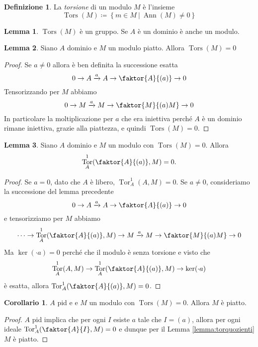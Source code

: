 \documentclass[a4paper,11pt,oneside]{book}
\newcommand{\set}[1]{\left\{ #1 \right\}}
\DeclareMathOperator{\Tor}{Tor}
\DeclareMathOperator{\tors}{Tors}
\DeclareMathOperator{\Ann}{Ann}
\theoremstyle{definition}
\newtheorem{de}{Definizione}
\newtheorem{lemma}{Lemma}
\newtheorem{cor}{Corollario}
\begin{document}
  \begin{de}
   La \emph{torsione} di un modulo $M$ è l'insieme 
   \[
    \tors(M)\coloneqq \set{m\in M \ |\ \Ann (M) \neq 0}
   \]
  \end{de}
  \begin{lemma}
   $\tors(M)$ è un gruppo. Se $A$ è un dominio è anche un modulo.
  \end{lemma}
  \begin{lemma}
   Siano $A$ dominio e $M$ un modulo piatto. Allora $\tors(M)=0$
  \end{lemma}
  \begin{proof}
   Se $a\neq 0$ allora è ben definita la successione esatta
   		\[
		 0\rightarrow A \xrightarrow a  A  \rightarrow  \faktor {A} {(a)} \rightarrow 0
		\]
  Tensorizzando per $M$ abbiamo
		\[
		 0\rightarrow M \xrightarrow a  M  \rightarrow  \faktor {M} {(a)M} \rightarrow 0
		\]
  In particolare la moltiplicazione per $a$ che era iniettiva perché $A$ è un dominio rimane iniettiva, grazie alla piattezza,
  e quindi $\tors(M)=0$. 
  \end{proof}
  \begin{lemma}
    Siano $A$ dominio e $M$ un modulo con $\tors(M)=0$. Allora
    \[
     \Tor_A^1(\faktor {A} {(a)}, M)=0.
    \]
  \end{lemma}
  \begin{proof}
   Se $a=0$, dato che $A$ è libero, $\Tor_A^1( {A}, M)=0$. Se $a\neq0$, consideriamo la successione del lemma precedente 
		\[
		 0\rightarrow A \xrightarrow a  A  \rightarrow  \faktor {A} {(a)} \rightarrow 0
		\]
  e tensorizziamo per $M$ abbiamo
		\[
		 \cdots\rightarrow\Tor_A^1(\faktor {A} {(a)}, M)\rightarrow M \xrightarrow a  M
		 \rightarrow  \faktor {M} {(a)M} \rightarrow 0
		\]
    Ma $\ker (\cdot a)=0$ perché che il modulo è senza torsione e visto che 
		\[
		 \Tor_A^1( {A}, M)\rightarrow \Tor_A^1(\faktor {A} {(a)}, M)  \rightarrow  \ker (\cdot a)
		\]
    è esatta, allora $\Tor_A^1(\faktor {A} {(a)}, M)=0$.
  \end{proof}
  
  \begin{cor}
   $A$ {\sc pid} e e $M$ un modulo con $\tors(M)=0$. Allora $M$ è piatto.
  \end{cor}
  \begin{proof}
   $A$ {\sc pid} implica che per ogni $I$ esiste $a$ tale che $I=(a)$, allora per ogni ideale
   $\Tor_A^1(\faktor {A} {I}, M)=0$ e dunque per il Lemma \ref{lemma:torquozienti} $M$ è piatto.
  \end{proof}
\end{document}
